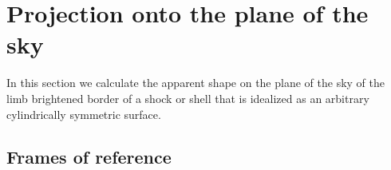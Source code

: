 \newenvironment{Vector}{\left(\begin{array}{c}}{\end{array}\right)}
\newcommand\uvec[1]{\bm{\hat{#1}}}
\newcommand\T{_{\mathrm{\scriptscriptstyle T}}}

\section{Projection onto the plane of the sky}
\label{sec:projection}

In this section we calculate the apparent shape on the plane of the
sky of the limb brightened border of a shock or shell that is
idealized as an arbitrary cylindrically symmetric surface.


\subsection{Frames of reference}
\label{sec:ref-frames}

